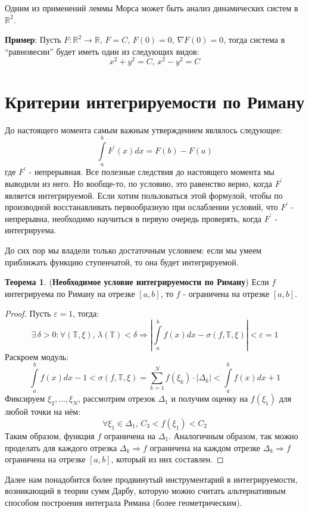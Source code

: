 \documentclass[12pt]{article}
\newcommand{\MR}{\mathbb{R}}
\newcommand{\MTB}{\mathbb{T}}
\newcommand{\VE}{\varepsilon}
\theoremstyle{definition}
\newtheorem{theorem}{Теорема}
\newcommand{\ddint}[2]{\displaystyle\int\limits_{#1}^{#2}}
\begin{document}
Одним из применений леммы Морса может быть анализ динамических систем в $\MR^2$. 

\textbf{Пример}: Пусть $F \colon \MR^2 \to \MR, \, F = C, \, F(0) = 0, \, \nabla F(0) = 0$, тогда система в ``равновесии'' будет иметь один из следующих видов:
$$
	x^2 + y^2 = C, \, x^2 - y^2 = C
$$

\newpage
\section*{Критерии интегрируемости по Риману}
До настоящего момента самым важным утверждением являлось следующее:
$$
	\ddint{a}{b}F^\prime(x)dx = F(b) - F(a)
$$
где $F^\prime$ - непрерывная. Все полезные следствия до настоящего момента мы выводили из него. Но вообще-то, по условию, это равенство верно, когда $F^\prime$ является интегрируемой. Если хотим пользоваться этой формулой, чтобы по производной восстанавливать первообразную при ослаблении условий, что $F^\prime$ - непрерывна, необходимо научиться в первую очередь проверять, когда $F^\prime$ - интегрируема.

До сих пор мы владели только достаточным условием: если мы умеем приближать функцию ступенчатой, то она будет интегрируемой.

\begin{theorem}(\textbf{Необходимое условие интегрируемости по Риману})
	Если $f$ интегрируема по Риману на отрезке $[a,b]$, то $f$ - ограничена на отрезке $[a,b]$.
\end{theorem}
\begin{proof}
	Пусть $\VE =1$, тогда:
	$$
		\exists \, \delta > 0 \colon \forall (\MTB, \xi), \, \lambda(\MTB) < \delta \Rightarrow \left|\ddint{a}{b}f(x)dx - \sigma(f, \MTB, \xi)\right| < \VE = 1
	$$
	Раскроем модуль:
	$$
		\ddint{a}{b}f(x)dx - 1 <\sigma(f, \MTB, \xi) = \sum\limits_{k = 1}^N f(\xi_k){\cdot}|\Delta_k| < \ddint{a}{b}f(x)dx + 1
	$$
	Фиксируем $\xi_2,\dotsc, \xi_N$, рассмотрим отрезок $\Delta_1$ и получим оценку на $f(\xi_1)$ для любой точки на нём:
	$$
		\forall \xi_1 \in \Delta_1, \, C_3 < f(\xi_1) < C_2	
	$$
	Таким образом, функция $f$ ограничена на $\Delta_1$. Аналогичным образом, так можно проделать для каждого отрезка $\Delta_k \Rightarrow f$ ограничена на каждом отрезке $\Delta_k \Rightarrow f$ ограничена на отрезке $[a,b]$, который из них составлен.
\end{proof}

Далее нам понадобится более продвинутый инструментарий в интегрируемости, возникающий в теории сумм Дарбу, которую можно считать альтернативным способом построения интеграла Римана (более геометрическим).
\newpage
\end{document}

